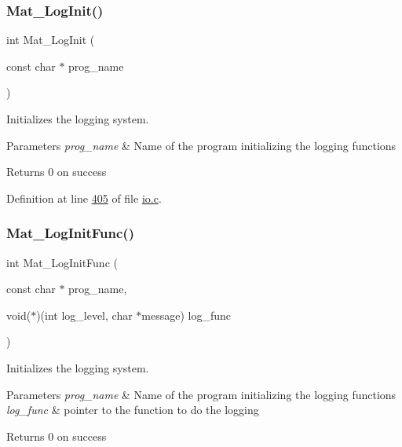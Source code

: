 \subsubsection{\texorpdfstring{Mat\+\_\+\+Log\+Init()}{Mat\_LogInit()}}
{\footnotesize\ttfamily int Mat\+\_\+\+Log\+Init (\begin{DoxyParamCaption}\item[{const char $\ast$}]{prog\+\_\+name }\end{DoxyParamCaption})}



Initializes the logging system. 


\begin{DoxyParams}{Parameters}
{\em prog\+\_\+name} & Name of the program initializing the logging functions \\
\hline
\end{DoxyParams}
\begin{DoxyReturn}{Returns}
0 on success 
\end{DoxyReturn}


Definition at line \hyperlink{io_8c_source_l00405}{405} of file \hyperlink{io_8c_source}{io.\+c}.

\mbox{\label{group__mat__util_ga93f4dd8d36413ae7f49260d757e3ab9f}} 
\subsubsection{\texorpdfstring{Mat\+\_\+\+Log\+Init\+Func()}{Mat\_LogInitFunc()}}
{\footnotesize\ttfamily int Mat\+\_\+\+Log\+Init\+Func (\begin{DoxyParamCaption}\item[{const char $\ast$}]{prog\+\_\+name,  }\item[{void($\ast$)(int log\+\_\+level, char $\ast$message)}]{log\+\_\+func }\end{DoxyParamCaption})}



Initializes the logging system. 


\begin{DoxyParams}{Parameters}
{\em prog\+\_\+name} & Name of the program initializing the logging functions \\
\hline
{\em log\+\_\+func} & pointer to the function to do the logging \\
\hline
\end{DoxyParams}
\begin{DoxyReturn}{Returns}
0 on success 
\end{DoxyReturn}


